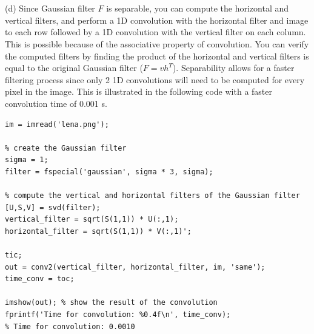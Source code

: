 \documentclass[11pt]{article}
\begin{document}
\\\\
(d)
Since Gaussian filter $F$ is separable, you can compute the horizontal and vertical filters, and perform a 1D convolution with the horizontal filter and image to each row followed by a 1D convolution with the vertical filter on each column. This is possible because of the associative property of convolution. You can verify the computed filters by finding the product of the horizontal and vertical filters is equal to the original Gaussian filter ($F=vh^T$). Separability allows for a faster filtering process since only 2 1D convolutions will need to be computed for every pixel in the image. This is illustrated in the following code with a faster convolution time of 0.001 s.
\begin{lstlisting}
im = imread('lena.png');

% create the Gaussian filter
sigma = 1;
filter = fspecial('gaussian', sigma * 3, sigma); 

% compute the vertical and horizontal filters of the Gaussian filter
[U,S,V] = svd(filter);
vertical_filter = sqrt(S(1,1)) * U(:,1);
horizontal_filter = sqrt(S(1,1)) * V(:,1)';

tic;
out = conv2(vertical_filter, horizontal_filter, im, 'same');
time_conv = toc;

imshow(out); % show the result of the convolution
fprintf('Time for convolution: %0.4f\n', time_conv);
% Time for convolution: 0.0010
\end{lstlisting}

\end{document}
